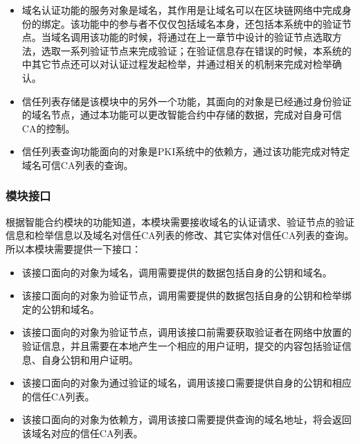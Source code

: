 \begin{itemize}
	\item 
	\noindent{}

	域名认证功能的服务对象是域名，其作用是让域名可以在区块链网络中完成身份的绑定。该功能中的参与者不仅仅包括域名本身，还包括本系统中的验证节点。当域名调用该功能的时候，将通过在上一章节中设计的验证节点选取方法，选取一系列验证节点来完成验证；在验证信息存在错误的时候，本系统的中其它节点还可以对认证过程发起检举，并通过相关的机制来完成对检举确认。

	\item 
	\noindent{}

	信任列表存储是该模块中的另外一个功能，其面向的对象是已经通过身份验证的域名节点，通过本功能可以更改智能合约中存储的数据，完成对自身可信CA的控制。

	\item
	\noindent{}

	信任列表查询功能面向的对象是PKI系统中的依赖方，通过该功能完成对特定域名可信CA列表的查询。

\end{itemize}


\subsubsection{模块接口}

根据智能合约模块的功能知道，本模块需要接收域名的认证请求、验证节点的验证信息和检举信息以及域名对信任CA列表的修改、其它实体对信任CA列表的查询。所以本模块需要提供一下接口：

\begin{itemize}
	\item 
	\noindent{}
	该接口面向的对象为域名，调用需要提供的数据包括自身的公钥和域名。

	\item
	\noindent{}

	该接口面向的对象为验证节点，调用需要提供的数据包括自身的公钥和检举绑定的公钥和域名。

	\item
	\noindent{}

	该接口面向的对象为验证节点，调用该接口前需要获取验证者在网络中放置的验证信息，并且需要在本地产生一个相应的用户证明，提交的内容包括验证信息、自身公钥和用户证明。

	\item
	\noindent{}

	该接口面向的对象为通过验证的域名，调用该接口需要提供自身的公钥和相应的信任CA列表。

	\item
	\noindent{}

	该接口面向的对象为依赖方，调用该接口需要提供查询的域名地址，将会返回该域名对应的信任CA列表。
	

\end{itemize}




